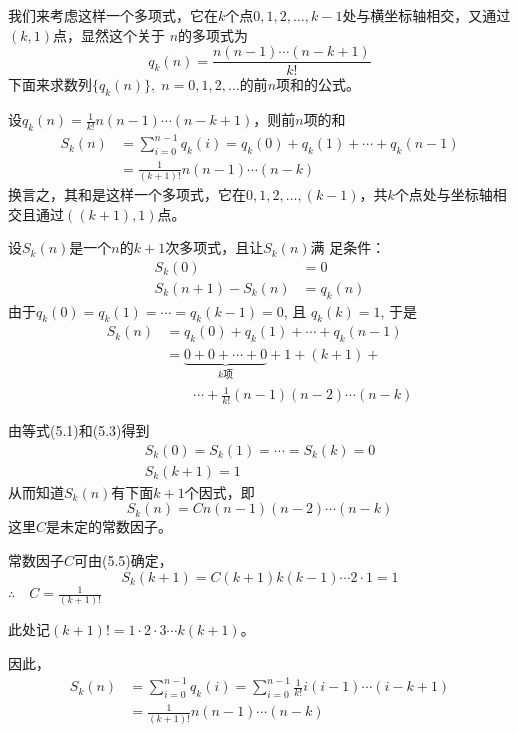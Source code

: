 我们来考虑这样一个多项式，它在$k$个点$0,1,2,\ldots,
k-1$处与横坐标轴相交，又通过$(k,1)$点，显然这个关于
$n$的多项式为
\[q_k(n)=\frac{n(n-1)\cdots(n-k+1)}{k!}\]
下面来求数列$\{q_k(n)\},\; n=0,1,2,\ldots$的前$n$项和的公式。

\begin{example}
设$q_k(n)=\frac{1}{k!}n(n-1)\cdots(n-k+1)$，则前$n$项的和
\[\begin{split}
    S_k(n)&=\sum^{n-1}_{i=0} q_k(i)=q_k(0)+q_k(1)+\cdots+q_k(n-1)\\
    &=\frac{1}{(k+1)!}n(n-1)\cdots(n-k)
\end{split}\]
换言之，其和是这样一个多项式，它在$0,1,2,\ldots,(k-1)$，共$k$个点处与坐标轴相交且通过$((k+1),1)$点。
\end{example}

\begin{solution}
设$S_k(n)$是一个$n$的$k+1$次多项式，且让$S_k(n)$满
足条件：
\begin{align}
    S_k(0)&=0\\
    S_k(n+1)-S_k(n)&=q_k(n)
\end{align}
由于$q_k(0)=q_k(1)=\cdots=q_k(k-1)=0$, 且
$q_k(k)=1$, 于是
\begin{equation}
    \begin{split}
 S_k(n)&=q_k(0)+q_k(1)+\cdots+q_k(n-1)\\
&=\underbrace{0+0+\cdots+0}_{\text{$k$项}}+1+(k+1)+\\
&\qquad \cdots+
\frac{1}{k!}(n-1)(n-2)\cdots(n-k)     
    \end{split}
\end{equation}

由等式(5.1)和(5.3)得到
\begin{align}
S_k(0)=S_k(1)=\cdots=S_k(k)=0\\
S_k(k+1)=1
\end{align}
从而知道$S_k(n)$有下面$k+1$个因式，即
\[S_k(n)=Cn(n-1)(n-2)\cdots(n-k)\]
这里$C$是未定的常数因子。

常数因子$C$可由(5.5)确定，
\[S_k(k+1)=C(k+1)k(k-1)\cdots2\cdot 1=1\]
$\therefore\quad C=\frac{1}{(k+1)!}$

此处记$(k+1)!=1\cdot 2\cdot 3\cdots k(k+1)$。

因此，
\[\begin{split}
    S_k(n)&=\sum^{n-1}_{i=0} q_k(i)=\sum^{n-1}_{i=0} \frac{1}{k!}i(i-1)\cdots (i-k+1)\\
    &=\frac{1}{(k+1)!}n(n-1)\cdots (n-k)
\end{split}\]
\end{solution}

